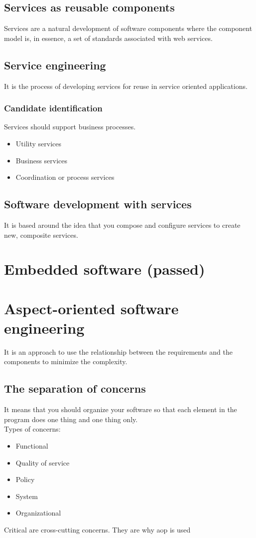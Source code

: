 \documentclass[a4paper,11pt,twocolumn]{report}
\begin{document}
    \section{Services as reusable components}
    Services are a natural development of software components where the
    component model is, in essence, a set of standards associated with web
    services.
    \section{Service engineering}
    It is the process of developing services for reuse in service oriented
    applications.
    \subsection{Candidate identification}
    Services should support business processes.
    \begin{itemize}
        \item Utility services
        \item Business services
        \item Coordination or process services
    \end{itemize}
    \section{Software development with services}
    It is based around the idea that you compose and configure services to
    create new, composite services.
    
    \chapter{Embedded software (passed)}
    
    \chapter{Aspect-oriented software engineering}
    It is an approach to use the relationship between the requirements and the
    components to minimize the complexity.
    \section{The separation of concerns}
    It means that you should organize your software so that each element in the
    program  does one thing and one thing only.\\
    Types of concerns:
    \begin{itemize}
        \item Functional
        \item Quality of service
        \item Policy
        \item System 
        \item Organizational 
    \end{itemize}
    Critical are cross-cutting concerns. They are why aop is used
\end{document}
